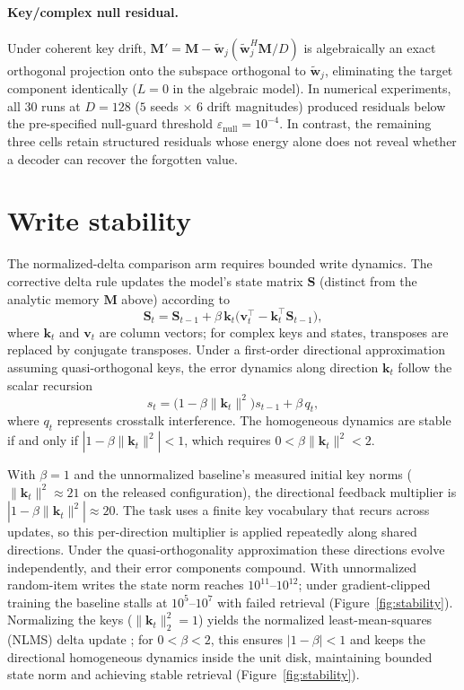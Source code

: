 \documentclass[11pt,a4paper]{article}
\newcommand{\w}{\mathbf{w}}
\newcommand{\M}{\mathbf{M}}
\newcommand{\St}{\mathbf{S}}
\begin{document}
\paragraph{Key/complex null residual.} Under coherent key drift, $\M' = \M - \tilde{\w}_j (\tilde{\w}_j^H \M / D)$ is algebraically an exact orthogonal projection onto the subspace orthogonal to $\tilde{\w}_j$, eliminating the target component identically ($L=0$ in the algebraic model). In numerical experiments, all 30 runs at $D=128$ ($5$ seeds $\times$ $6$ drift magnitudes) produced residuals below the pre-specified null-guard threshold $\varepsilon_{\text{null}} = 10^{-4}$. In contrast, the remaining three cells retain structured residuals whose energy alone does not reveal whether a decoder can recover the forgotten value.

\section{Write stability}\label{sec:stability}

The normalized-delta comparison arm requires bounded write dynamics. The corrective delta rule updates the model's state matrix $\St$ (distinct from the analytic memory $\M$ above) according to
\begin{equation}
\St_t = \St_{t-1} + \beta\, \mathbf{k}_t \bigl(\mathbf{v}_t^\top - \mathbf{k}_t^\top \St_{t-1}\bigr),
\end{equation}
where $\mathbf{k}_t$ and $\mathbf{v}_t$ are column vectors; for complex keys and states, transposes are replaced by conjugate transposes.
Under a first-order directional approximation assuming quasi-orthogonal keys, the error dynamics along direction $\mathbf{k}_t$ follow the scalar recursion
\begin{equation}
s_t = \bigl(1 - \beta\|\mathbf{k}_t\|^2\bigr) s_{t-1} + \beta\, q_t,
\end{equation}
where $q_t$ represents crosstalk interference. The homogeneous dynamics are stable if and only if $|1 - \beta\|\mathbf{k}_t\|^2| < 1$, which requires $0 < \beta\|\mathbf{k}_t\|^2 < 2$.

With $\beta=1$ and the unnormalized baseline's measured initial key norms ($\|\mathbf{k}_t\|^2 \approx 21$ on the released configuration), the directional feedback multiplier is $|1 - \beta\|\mathbf{k}_t\|^2| \approx 20$. The task uses a finite key vocabulary that recurs across updates, so this per-direction multiplier is applied repeatedly along shared directions. Under the quasi-orthogonality approximation these directions evolve independently, and their error components compound. With unnormalized random-item writes the state norm reaches $10^{11}$--$10^{12}$; under gradient-clipped training the baseline stalls at $10^{5}$--$10^{7}$ with failed retrieval (Figure~\ref{fig:stability}). Normalizing the keys ($\|\mathbf{k}_t\|_2^2=1$) yields the normalized least-mean-squares (NLMS) delta update \citep{widrow1960adaptive,widrow1985adaptive}; for $0 < \beta < 2$, this ensures $|1-\beta|<1$ and keeps the directional homogeneous dynamics inside the unit disk, maintaining bounded state norm and achieving stable retrieval (Figure~\ref{fig:stability}).
\end{document}
